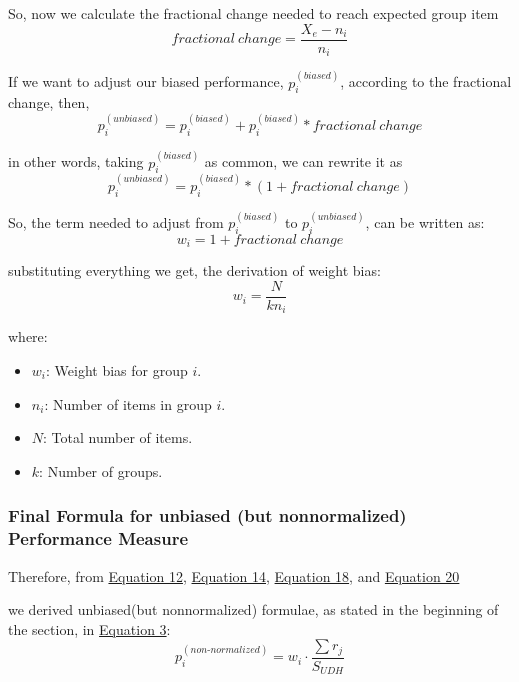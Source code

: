 \documentclass[a4paper,fleqn,review]{cas-sc}
\begin{document}
So, now we calculate the fractional change needed to reach expected group item
\begin{equation}
 fractional \ change = \frac{X_e - n_i}{n_i}
\end{equation}

If we want to adjust our biased performance, $p_i^{(biased)}$, according to the fractional change, 
then,
\begin{equation}
    p_i^{(unbiased)} = p_i^{(biased)} +  p_i^{(biased)} *  fractional \ change
\end{equation}

in other words, taking $p_i^{(biased)}$ as common, we can rewrite it as
\begin{equation}
\label{eq:p-unbiased}
    p_i^{(unbiased)} = p_i^{(biased)} * (1 +  fractional \ change)
\end{equation}

So, the term needed to adjust from $p_i^{(biased)}$ to $p_i^{(unbiased)}$, can be written as:
\begin{equation}
    w_i = 1 + fractional \ change
\end{equation}

substituting everything we get, the derivation of weight bias:
\begin{equation}\label{eq:weight-bias}
    w_i = \frac{N}{kn_i}
\end{equation}

where:
\begin{itemize}
    \item $w_i$: Weight bias for group $i$.
    \item $n_i$: Number of items in group $i$.
    \item $N$: Total number of items.
    \item $k$: Number of groups.
\end{itemize}

\subsubsection{Final Formula for unbiased (but non\text{-}normalized) Performance Measure}
Therefore, from \hyperref[eq:SUDH]{Equation 12}, \hyperref[eq:p-biased]{Equation 14},  \hyperref[eq:p-unbiased]{Equation 18}, and \hyperref[eq:weight-bias]{Equation 20}

we derived unbiased(but non\text{-}normalized) formulae, as stated in the beginning of the section, in \hyperref[eq:non-normalized]{Equation 3}:
\begin{equation}
	\label{p-non-normalized}
    p_i^{(non\text{-}normalized)} = w_i \cdot \frac{\sum r_j}{ S_{UDH} }
\end{equation}
\end{document}
